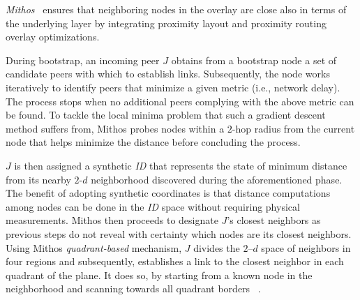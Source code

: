




\emph{Mithos}~\cite{WR2003} ensures that neighboring nodes in the overlay are
close also in terms of the underlying layer by integrating proximity layout
and proximity routing overlay optimizations.

During bootstrap, an incoming peer $J$ obtains from a bootstrap node a set of
candidate peers with which to establish links. 
Subsequently, the node works iteratively to identify peers that minimize
a given metric (i.e., network delay).
The process stops when no additional peers complying with the above metric 
can be found. 
% 
To tackle the local
minima problem that such a gradient descent method suffers from, Mithos probes
nodes within a $2$-hop radius from the current node that helps minimize
the distance before concluding the process.

$J$ is then assigned a synthetic \emph{ID} that
represents the state of minimum distance from its nearby $2$-$d$ neighborhood 
discovered during the aforementioned phase. %
The benefit of adopting synthetic coordinates is that distance computations
among nodes can be done in the \emph{ID} space without requiring physical
measurements. 
Mithos then proceeds to designate $J$'s closest neighbors as 
previous steps do not reveal with certainty which nodes are its closest
neighbors.
Using Mithos \emph{quadrant-based} mechanism,
$J$  divides the $2$--$d$ space of neighbors in four regions and 
subsequently, establishes a link 
to the closest neighbor in each quadrant of the plane. 
It does so, by starting from a known node in the neighborhood
and scanning towards all quadrant borders ~\cite{KK2000,R2002}. 

